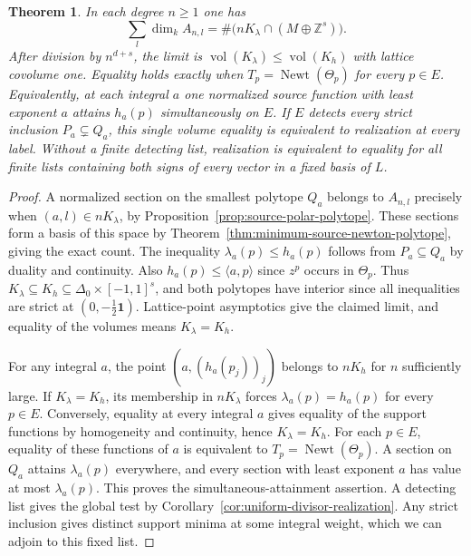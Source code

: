 \documentclass[11pt,reqno]{amsart}
\numberwithin{equation}{section}
\newtheorem{theorem}{Theorem}[section]
\theoremstyle{definition}
\theoremstyle{remark}
\DeclareMathOperator{\Newt}{Newt}
\begin{document}
\begin{theorem}\label{thm:finite-valuation-volume}
In each degree \(n\ge1\) one has
\[ \sum_l\dim_k A_{n,l}=\#\bigl(nK_\lambda\cap(M\oplus\mathbb Z^s)\bigr). \]
After division by \(n^{d+s}\), the limit is \(\operatorname{vol}(K_\lambda)
\le\operatorname{vol}(K_h)\) with lattice covolume one. Equality
holds exactly when \(T_p=\Newt(\Theta_p)\) for every \(p\in E\).
Equivalently, at each integral \(a\) one normalized source function
with least exponent \(a\) attains \(h_a(p)\) simultaneously on \(E\).
If \(E\) detects every strict inclusion \(P_a\subsetneq Q_a\), this
single volume equality is equivalent to realization at every label. Without
a finite detecting list, realization is equivalent to equality for
all finite lists containing both signs of every vector in a fixed basis of \(L\).
\end{theorem}
\begin{proof}
A normalized section on the smallest polytope \(Q_a\) belongs to
\(A_{n,l}\) precisely when \((a,l)\in nK_\lambda\), by
Proposition~\ref{prop:source-polar-polytope}. These sections form a
basis of this space by Theorem~\ref{thm:minimum-source-newton-polytope},
giving the exact count. The inequality \(\lambda_a(p)\le h_a(p)\) follows
from \(P_a\subseteq Q_a\) by duality and continuity. Also
\(h_a(p)\le\langle a,p\rangle\) since \(z^p\) occurs in \(\Theta_p\).
Thus \(K_\lambda\subseteq K_h\subseteq\Delta_0\times[-1,1]^s\), and both
polytopes have interior since all inequalities are strict at
\((0,-\tfrac12\mathbf1)\). Lattice-point asymptotics give the claimed
limit, and equality of the volumes means \(K_\lambda=K_h\).

For any integral \(a\), the point \((a,(h_a(p_j))_j)\) belongs to
\(nK_h\) for \(n\) sufficiently large. If \(K_\lambda=K_h\), its membership
in \(nK_\lambda\) forces \(\lambda_a(p)=h_a(p)\) for every \(p\in E\).
Conversely, equality at every integral \(a\) gives equality of the
support functions by homogeneity and continuity, hence \(K_\lambda=K_h\).
For each \(p\in E\), equality of these functions of \(a\) is equivalent
to \(T_p=\Newt(\Theta_p)\).
A section on \(Q_a\) attains \(\lambda_a(p)\) everywhere, and every section
with least exponent \(a\) has value at most \(\lambda_a(p)\). This proves
the simultaneous-attainment assertion. A detecting list gives the
global test by Corollary~\ref{cor:uniform-divisor-realization}. Any
strict inclusion gives distinct support minima at some integral weight,
which we can adjoin to this fixed list.
\end{proof}
\end{document}

